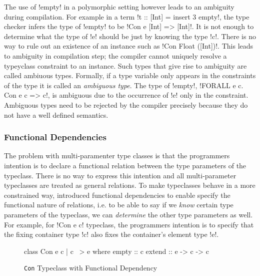 \documentclass[screen,nonacm]{acmart}
\begin{document}
The use of !empty! in a polymorphic setting however leads to an ambiguity during
compilation. For example in a term !t :: [Int] = insert 3 empty!, the type checker infers
the type of !empty! to be !Con e [Int] => [Int]!. It is not enough to determine what the
type of !e! should be just by knowing the type !c!. There is no way to rule out an
existence of an instance such as !Con Float ([Int])!. This leads to ambiguity in
compilation step; the compiler cannot uniquely resolve a typeyclass constraint to an
instance. Such types that give rise to ambiguity are called ambiuous types. Formally, if a
type variable only appears in the constraints of the type it is called an \emph{ambiguous
  type}. The type of !empty!, !FORALL e c. Con e c => c!, is ambiguous due to the
occurrence of !e! only in the constraint. Ambiguous types need to be rejected by the
compiler precisely because they do not have a well defined semantics.



\subsubsection{Functional Dependencies}
The problem with multi-paramenter type classes is that the programmers intention is to declare a functional relation between the type parameters of the typeclass. There is no way to express this intention and all multi-parameter typeclasses are treated as general relations. To make typeclasses behave in a more constrained way, \citet{jones_tcfd_2000} introduced functional dependencies to enable specify the functional nature of relations, i.e. to be able to say if we \emph{know} certain type parameters of the typeclass, we can \emph{determine} the other type parameters as well. For example, for !Con e c! typeclass, the programmers intention is to specify that the fixing container type !c! also fixes the container's element type !e!.

\begin{figure}[ht]
\begin{CenteredBox}
\begin{code}
class Con e c | c ~> e where
  empty :: c
  extend :: e -> c -> c
\end{code}
\end{CenteredBox}
\caption[\lstinline{Con} typeclass]{\lstinline{Con} Typeclass with Functional Dependency}
\label{fig:tc-collection-fd}
\end{figure}
\end{document}
